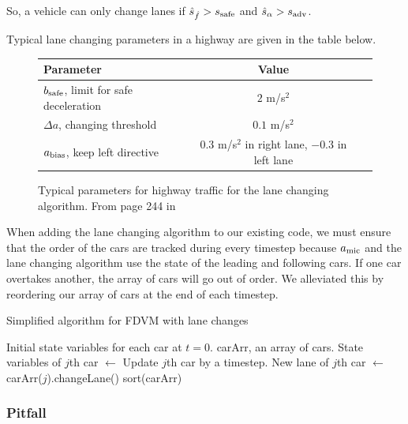 \documentclass[12pt]{article}
\begin{document}
      So, a vehicle can only change lanes if $\hat s_{\hat f} > s_{\rm safe}$ and $\hat s_{\alpha} > s_{\rm adv}$. 

      Typical lane changing parameters in a highway are given in the table below. 
      \begin{figure}[H]
        \begin{center}
          \begin{tabular}{l c c } 
          Parameter & Value \\
          \hline
          $b_{\rm safe}$, limit for safe deceleration & $2$ m/s$^2$ \\
          $\Delta a$, changing threshold & $0.1$ m/s$^2$ \\
          $a_{\rm bias}$, keep left directive & $0.3$ m/s$^2$ in right lane, $-0.3$ in left lane \\

          \end{tabular}
          \end{center}
          \caption{Typical parameters for highway traffic for the lane changing algorithm. From page 244 in \cite{traffic}}
      \end{figure}

      When adding the lane changing algorithm to our existing code, we must ensure that the order of the cars are tracked during every timestep because $a_{\rm mic}$ and the lane changing algorithm use the state of the leading and following cars. If one car overtakes another, the array of cars will go out of order. We alleviated this by reordering our array of cars at the end of each timestep.  
      \begin{algorithm}
        \caption{Simplified algorithm for FDVM with lane changes}\label{alg:car-following-lane}
        \begin{algorithmic}
        \Require Initial state variables for each car at $t=0$. 
        \Require carArr, an array of cars.
          \State State variables of $j$th car $\gets$ Update $j$th car by a timestep.
          \State New lane of $j$th car $\gets$ carArr($j$).changeLane()
          \EndFor
          \State sort(carArr)
        \EndFor
        \end{algorithmic}
        \end{algorithm}
    \subsubsection{Pitfall} \label{lane change pitfalls}
\end{document}
